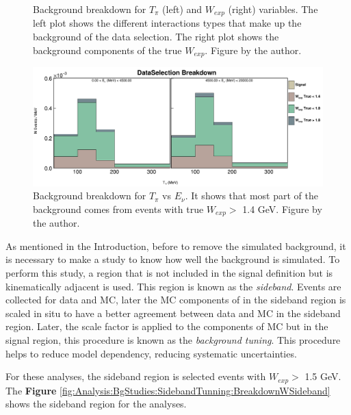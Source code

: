 \begin{figure}[!htb]
    \caption{Background breakdown for $T_\pi$ (left) and $W_{exp}$ (right) variables. The left plot shows the different interactions types that make up the background of the data selection. The right plot shows the background components of the true $W_{exp}$. Figure by the author.}
    \label{fig:Analysis:BgStudies:SidebandTunning:BGBreakdownTpiWexp}
\end{figure}

\begin{figure}[!htb]
    \centering
    \includegraphics[scale=0.3]{Figures/Chapter4/BGStudies/2D_Breakdown_Sel_tpi_vs_enu_WSB.png}
    \caption{Background breakdown for $T_\pi$ vs $E_\nu$. It shows that most part of the background comes from events with true $W_{exp} > $ 1.4 GeV. Figure by the author.}
    \label{fig:Analysis:BgStudies:SidebandTunning:BGBreakdown2D}
\end{figure}


As mentioned in the Introduction, before to remove the simulated background, it is necessary to make a study to know how well the background is simulated. To perform this study, a region that is not included in the signal definition but is kinematically adjacent is used. This region is known as the \textit{sideband}. Events are collected for data and MC, later the MC components of in the sideband region is scaled in situ to have a better agreement between data and MC in the sideband region. Later, the scale factor is applied to the components of MC but in the signal region, this procedure is known as the \textit{ background tuning}. This procedure helps to reduce model dependency, reducing systematic uncertainties. 

For these analyses, the sideband region is selected events with $W_{exp} > $ 1.5 GeV. The \textbf{Figure} \ref{fig:Analysis:BgStudies:SidebandTunning:BreakdownWSideband} shows the sideband region for the analyses. 

